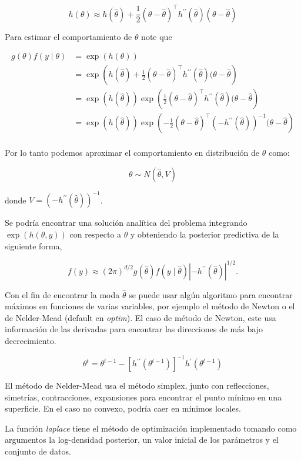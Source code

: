\documentclass[
  12pt,
]{book}
\theoremstyle{definition}
\theoremstyle{definition}
\theoremstyle{definition}
\theoremstyle{definition}
\theoremstyle{remark}
\begin{document}
\[h(\theta)\approx h(\hat \theta) + \frac{1}{2}(\theta-\hat \theta)^\top h^{\prime\prime}(\hat \theta)(\theta-\hat \theta)\]

Para estimar el comportamiento de \(\theta\) note que

\begin{align*}
g(\theta)f(y\mid \theta) 
&= \exp\left(h(\theta)\right)\\
&= \exp \left(h(\hat \theta) + \frac{1}{2}(\theta-\hat \theta)^\top h^{\prime\prime}(\hat \theta)(\theta-\hat \theta \right) \\
&= \exp \left(h(\hat \theta)\right) \exp\left(\frac{1}{2}(\theta-\hat \theta)^\top h^{\prime\prime}(\hat \theta)(\theta-\hat \theta \right) \\
&= \exp \left(h(\hat \theta)\right) \exp\left(-\frac{1}{2}(\theta-\hat \theta)^\top (-h^{\prime\prime}(\hat \theta))^{-1}(\theta-\hat \theta \right) \\
\end{align*}

Por lo tanto podemos aproximar el comportamiento en distribución de \(\theta\) como:

\[\theta \sim N(\hat \theta,V)\]

donde \(V=(-h^{\prime\prime}(\hat \theta))^{-1}\).

Se podría encontrar una solución analítica del problema integrando \(\exp(h(\theta,y))\) con respecto a \(\theta\) y obteniendo la posterior predictiva de la siguiente forma,

\[
f(y) \approx(2 \pi)^{d / 2} g(\hat{\theta}) f(y \mid \hat{\theta})\left|-h^{\prime \prime}(\hat{\theta})\right|^{1 / 2}.
\]

Con el fin de encontrar la moda \(\hat \theta\) se puede usar algún algoritmo para encontrar máximos en funciones de varias variables, por ejemplo el método de Newton o el de Nelder-Mead (default en \emph{optim}). El caso de método de Newton, este usa información de las derivadas para encontrar las direcciones de más bajo decrecimiento.

\[
\theta^{t}=\theta^{t-1}-\left[h^{\prime \prime}\left(\theta^{t-1}\right)\right]^{-1} h^{\prime}\left(\theta^{t-1}\right)
\]

El método de Nelder-Mead usa el método simplex, junto con reflecciones, simetrías, contracciones, expansiones para encontrar el punto mínimo en una superficie. En el caso no convexo, podría caer en mínimos locales.

La función \emph{laplace} tiene el método de optimización implementado tomando como argumentos la log-densidad posterior, un valor inicial de los parámetros y el conjunto de datos.
\end{document}
